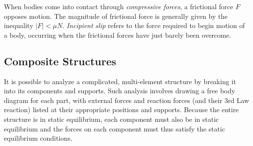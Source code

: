 When bodies come into contact through \textit{compressive forces}, a frictional force $F$ opposes motion. The magnitude of frictional force is generally given by the inequality $|F| < \mu N$. \textit{Incipient slip} refers to the force required to begin motion of a body, occurring when the frictional forces have just barely been overcome.

\subsection{Composite Structures}

It is possible to analyze a complicated, multi-element structure by breaking it into its components and supports. Such analysis involves drawing a free body diagram for each part, with external forces and reaction forces (and their 3rd Law reaction) listed at their appropriate positions and supports. Because the entire structure is in static equilibrium, each component must also be in static equilibrium and the forces on each component must thus satisfy the static equilibrium conditions.


